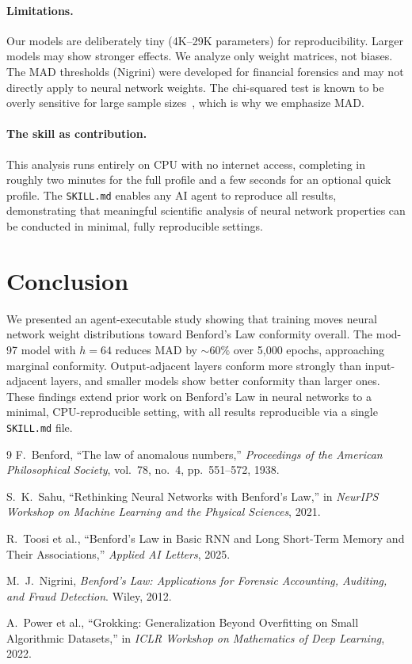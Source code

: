 \documentclass[11pt]{article}
\begin{document}
\paragraph{Limitations.}
Our models are deliberately tiny (4K--29K parameters) for reproducibility. Larger models may show stronger effects. We analyze only weight matrices, not biases. The MAD thresholds (Nigrini) were developed for financial forensics and may not directly apply to neural network weights. The chi-squared test is known to be overly sensitive for large sample sizes~\cite{nigrini2012}, which is why we emphasize MAD.

\paragraph{The skill as contribution.}
This analysis runs entirely on CPU with no internet access, completing in roughly two minutes for the full profile and a few seconds for an optional quick profile. The \texttt{SKILL.md} enables any AI agent to reproduce all results, demonstrating that meaningful scientific analysis of neural network properties can be conducted in minimal, fully reproducible settings.

\section{Conclusion}

We presented an agent-executable study showing that training moves neural network weight distributions toward Benford's Law conformity overall. The mod-97 model with $h=64$ reduces MAD by ${\sim}60\%$ over 5{,}000 epochs, approaching marginal conformity. Output-adjacent layers conform more strongly than input-adjacent layers, and smaller models show better conformity than larger ones. These findings extend prior work on Benford's Law in neural networks to a minimal, CPU-reproducible setting, with all results reproducible via a single \texttt{SKILL.md} file.

\begin{thebibliography}{9}
F.~Benford,
``The law of anomalous numbers,''
\emph{Proceedings of the American Philosophical Society}, vol.~78, no.~4, pp.~551--572, 1938.

S.~K.~Sahu,
``Rethinking Neural Networks with Benford's Law,''
in \emph{NeurIPS Workshop on Machine Learning and the Physical Sciences}, 2021.

R.~Toosi et al.,
``Benford's Law in Basic RNN and Long Short-Term Memory and Their Associations,''
\emph{Applied AI Letters}, 2025.

M.~J.~Nigrini,
\emph{Benford's Law: Applications for Forensic Accounting, Auditing, and Fraud Detection}.
Wiley, 2012.

A.~Power et al.,
``Grokking: Generalization Beyond Overfitting on Small Algorithmic Datasets,''
in \emph{ICLR Workshop on Mathematics of Deep Learning}, 2022.
\end{thebibliography}
\end{document}
